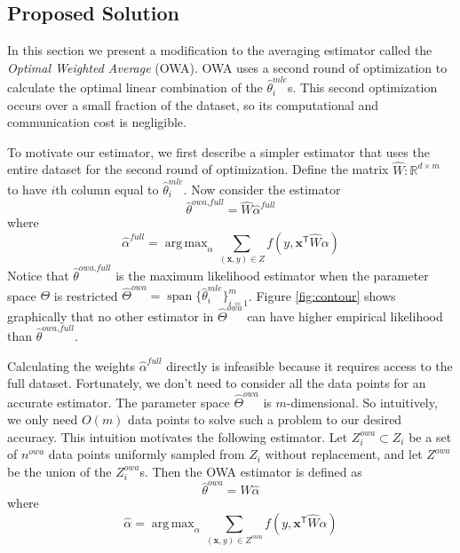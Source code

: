 \documentclass[twoside]{article}
\DeclareMathOperator*{\argmax}{arg\,max}
\DeclareMathOperator*{\vecspan}{span}
\newcommand{\Zreopt}{Z^{\textit{owa}}}
\newcommand{\nreopt}{n^{\textit{owa}}}
\newcommand{\W}{{\hat \Theta^{\textit{owa}}}}
\newcommand{\x}{\mathbf{x}}
\newcommand{\w}{\theta}
\newcommand{\ahat}{\hat\alpha}
\newcommand{\afull}{\ahat^{\textit{full}}}
\newcommand{\wowa}{\hat\w^{owa}}
\newcommand{\wowafull}{\hat\w^{\textit{owa,full}}}
\newcommand{\wmle}{\hat\w^{mle}}
\newcommand{\trans}[1]{\ensuremath{{#1}^{\mathsf{T}}}}
\begin{document}
\subsection{Proposed Solution}

In this section we present a modification to the averaging estimator called the \emph{Optimal Weighted Average} (OWA).
OWA uses a second round of optimization to calculate the optimal linear combination of the $\wmle_i$s.
This second optimization occurs over a small fraction of the dataset,
so its computational and communication cost is negligible.

To motivate our estimator, we first describe a simpler estimator that uses the entire dataset for the second round of optimization.
Define the matrix $\hat W : \mathbb{R}^{d\times m}$ to have $i$th column equal to $\wmle_i$.
Now consider the estimator
\begin{equation}
\wowafull = \hat W \afull
\end{equation}
where
\begin{equation}
\afull = \argmax_\alpha \sum _{(\x,y)\in Z} f\left(y,\trans\x \hat W \alpha \right)
\end{equation}
Notice that $\wowafull$ is the maximum likelihood estimator when the parameter space $\Theta$ is restricted $\W = \vecspan \{\wmle_i\}_{i=1}^m$.
Figure \ref{fig:contour} shows graphically that no other estimator in $\W$ can have higher empirical likelihood than $\wowafull$.

Calculating the weights $\afull$ directly is infeasible because it requires access to the full dataset.
Fortunately, we don't need to consider all the data points for an accurate estimator.
The parameter space $\W$ is $m$-dimensional.
So intuitively, we only need $O(m)$ data points to solve such a problem to our desired accuracy.
This intuition motivates the following estimator.
Let $\Zreopt_i\subset Z_i$ be a set of $\nreopt$ data points uniformly sampled from $Z_i$ without replacement,
and let $\Zreopt$ be the union of the $\Zreopt_i$s.
Then the OWA estimator is defined as
\begin{equation}
\wowa = \hat W \ahat
\end{equation}
where
\begin{equation}
\ahat = \argmax_\alpha \sum _{(\x,y)\in \Zreopt} f\left(y,\trans\x \hat W \alpha \right)
\end{equation}
\end{document}

